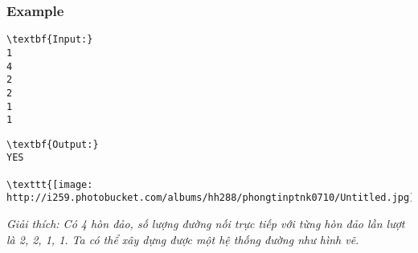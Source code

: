 \subsubsection{Example}
\begin{verbatim}
\textbf{Input:}
1
4
2
2
1
1\end{verbatim}
\begin{verbatim}
\textbf{Output:}
YES

\texttt{[image: http://i259.photobucket.com/albums/hh288/phongtinptnk0710/Untitled.jpg]}\end{verbatim}

\emph{Giải thích: Có 4 hòn đảo, số lượng đường nối trực tiếp với từng hòn đảo lần lượt là 2, 2, 1, 1. Ta có thể xây dựng được một hệ thống đường như hình vẽ. }
